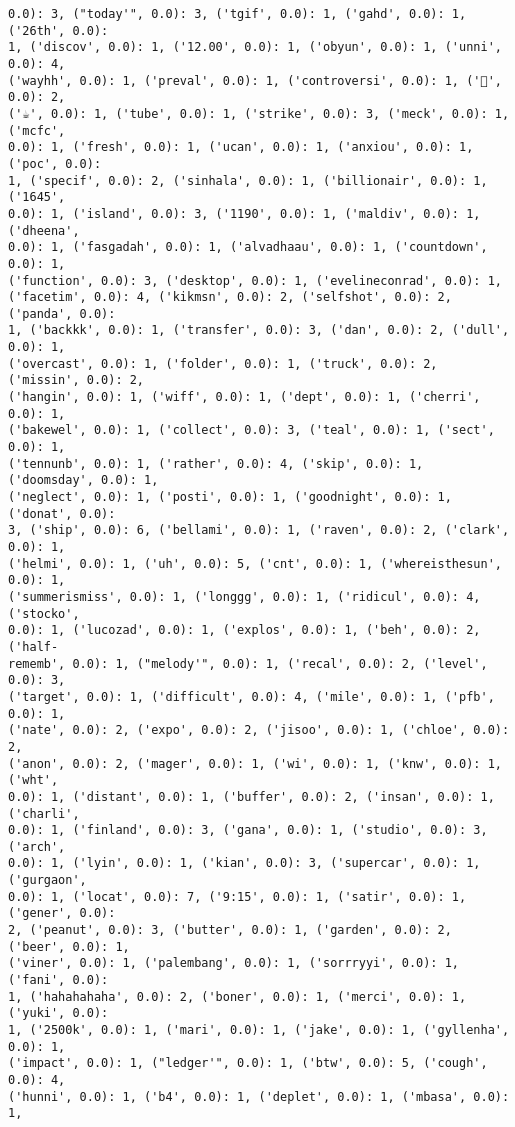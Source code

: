 \documentclass[11pt]{article}
\begin{document}
\begin{Verbatim}[commandchars=\\\{\}]
0.0): 3, ("today'", 0.0): 3, ('tgif', 0.0): 1, ('gahd', 0.0): 1, ('26th', 0.0):
1, ('discov', 0.0): 1, ('12.00', 0.0): 1, ('obyun', 0.0): 1, ('unni', 0.0): 4,
('wayhh', 0.0): 1, ('preval', 0.0): 1, ('controversi', 0.0): 1, ('🍵', 0.0): 2,
('☕', 0.0): 1, ('tube', 0.0): 1, ('strike', 0.0): 3, ('meck', 0.0): 1, ('mcfc',
0.0): 1, ('fresh', 0.0): 1, ('ucan', 0.0): 1, ('anxiou', 0.0): 1, ('poc', 0.0):
1, ('specif', 0.0): 2, ('sinhala', 0.0): 1, ('billionair', 0.0): 1, ('1645',
0.0): 1, ('island', 0.0): 3, ('1190', 0.0): 1, ('maldiv', 0.0): 1, ('dheena',
0.0): 1, ('fasgadah', 0.0): 1, ('alvadhaau', 0.0): 1, ('countdown', 0.0): 1,
('function', 0.0): 3, ('desktop', 0.0): 1, ('evelineconrad', 0.0): 1,
('facetim', 0.0): 4, ('kikmsn', 0.0): 2, ('selfshot', 0.0): 2, ('panda', 0.0):
1, ('backkk', 0.0): 1, ('transfer', 0.0): 3, ('dan', 0.0): 2, ('dull', 0.0): 1,
('overcast', 0.0): 1, ('folder', 0.0): 1, ('truck', 0.0): 2, ('missin', 0.0): 2,
('hangin', 0.0): 1, ('wiff', 0.0): 1, ('dept', 0.0): 1, ('cherri', 0.0): 1,
('bakewel', 0.0): 1, ('collect', 0.0): 3, ('teal', 0.0): 1, ('sect', 0.0): 1,
('tennunb', 0.0): 1, ('rather', 0.0): 4, ('skip', 0.0): 1, ('doomsday', 0.0): 1,
('neglect', 0.0): 1, ('posti', 0.0): 1, ('goodnight', 0.0): 1, ('donat', 0.0):
3, ('ship', 0.0): 6, ('bellami', 0.0): 1, ('raven', 0.0): 2, ('clark', 0.0): 1,
('helmi', 0.0): 1, ('uh', 0.0): 5, ('cnt', 0.0): 1, ('whereisthesun', 0.0): 1,
('summerismiss', 0.0): 1, ('longgg', 0.0): 1, ('ridicul', 0.0): 4, ('stocko',
0.0): 1, ('lucozad', 0.0): 1, ('explos', 0.0): 1, ('beh', 0.0): 2, ('half-
rememb', 0.0): 1, ("melody'", 0.0): 1, ('recal', 0.0): 2, ('level', 0.0): 3,
('target', 0.0): 1, ('difficult', 0.0): 4, ('mile', 0.0): 1, ('pfb', 0.0): 1,
('nate', 0.0): 2, ('expo', 0.0): 2, ('jisoo', 0.0): 1, ('chloe', 0.0): 2,
('anon', 0.0): 2, ('mager', 0.0): 1, ('wi', 0.0): 1, ('knw', 0.0): 1, ('wht',
0.0): 1, ('distant', 0.0): 1, ('buffer', 0.0): 2, ('insan', 0.0): 1, ('charli',
0.0): 1, ('finland', 0.0): 3, ('gana', 0.0): 1, ('studio', 0.0): 3, ('arch',
0.0): 1, ('lyin', 0.0): 1, ('kian', 0.0): 3, ('supercar', 0.0): 1, ('gurgaon',
0.0): 1, ('locat', 0.0): 7, ('9:15', 0.0): 1, ('satir', 0.0): 1, ('gener', 0.0):
2, ('peanut', 0.0): 3, ('butter', 0.0): 1, ('garden', 0.0): 2, ('beer', 0.0): 1,
('viner', 0.0): 1, ('palembang', 0.0): 1, ('sorrryyi', 0.0): 1, ('fani', 0.0):
1, ('hahahahaha', 0.0): 2, ('boner', 0.0): 1, ('merci', 0.0): 1, ('yuki', 0.0):
1, ('2500k', 0.0): 1, ('mari', 0.0): 1, ('jake', 0.0): 1, ('gyllenha', 0.0): 1,
('impact', 0.0): 1, ("ledger'", 0.0): 1, ('btw', 0.0): 5, ('cough', 0.0): 4,
('hunni', 0.0): 1, ('b4', 0.0): 1, ('deplet', 0.0): 1, ('mbasa', 0.0): 1,

\end{Verbatim}
\end{document}
